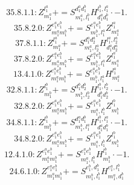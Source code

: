 \documentclass[letterpaper,10pt,fleqn,leqno,onecolumn]{article}
\begin{document}
\begin{equation} \;\;\;\;\;\;  35.8.1.1: Z^{l_{1}^{a}}_{m_{1}^{a}}+=S^{d_{1}^{a}d_{1}^{b}}_{m_{1}^{a},l_{1}^{b}}H^{l_{1}^{b},l_{1}^{a}}_{d_{1}^{a}d_{1}^{b}}\cdot -1. \end{equation}
\begin{equation} \;\;\;\;\;\;  35.8.2.0: Z^{e_{1}^{a}e_{1}^{b}}_{m_{1}^{a}m_{1}^{b}}+=S^{e_{1}^{a}e_{1}^{b}}_{m_{1}^{b},l_{1}^{a}}Z^{l_{1}^{a}}_{m_{1}^{a}} \end{equation}
\begin{equation} \;\;\;\;\;\;  37.8.1.1: Z^{l_{1}^{a}}_{m_{1}^{a}}+=S^{d_{1}^{a}d_{2}^{a}}_{m_{1}^{a},l_{2}^{a}}H^{l_{1}^{a},l_{2}^{a}}_{d_{1}^{a}d_{2}^{a}} \end{equation}
\begin{equation} \;\;\;\;\;\;  37.8.2.0: Z^{e_{1}^{a}e_{1}^{b}}_{m_{1}^{a}m_{1}^{b}}+=S^{e_{1}^{a}e_{1}^{b}}_{m_{1}^{b},l_{1}^{a}}Z^{l_{1}^{a}}_{m_{1}^{a}} \end{equation}
\begin{equation} \;\;\;\;\;\;  13.4.1.0: Z^{e_{1}^{a}e_{1}^{b}}_{m_{1}^{a}m_{1}^{b}}+=S^{e_{1}^{a}e_{1}^{b}}_{m_{1}^{b},l_{1}^{a}}H^{l_{1}^{a}}_{m_{1}^{a}} \end{equation}
\begin{equation} \;\;\;\;\;\;  32.8.1.1: Z^{l_{1}^{b}}_{m_{1}^{b}}+=S^{d_{1}^{b}d_{2}^{b}}_{m_{1}^{b},l_{2}^{b}}H^{l_{1}^{b},l_{2}^{b}}_{d_{1}^{b}d_{2}^{b}}\cdot -1. \end{equation}
\begin{equation} \;\;\;\;\;\;  32.8.2.0: Z^{e_{1}^{a}e_{1}^{b}}_{m_{1}^{a}m_{1}^{b}}+=S^{e_{1}^{a}e_{1}^{b}}_{m_{1}^{a},l_{1}^{b}}Z^{l_{1}^{b}}_{m_{1}^{b}} \end{equation}
\begin{equation} \;\;\;\;\;\;  34.8.1.1: Z^{l_{1}^{b}}_{m_{1}^{b}}+=S^{d_{1}^{a}d_{1}^{b}}_{m_{1}^{b},l_{1}^{a}}H^{l_{1}^{b},l_{1}^{a}}_{d_{1}^{a}d_{1}^{b}}\cdot -1. \end{equation}
\begin{equation} \;\;\;\;\;\;  34.8.2.0: Z^{e_{1}^{a}e_{1}^{b}}_{m_{1}^{a}m_{1}^{b}}+=S^{e_{1}^{a}e_{1}^{b}}_{m_{1}^{a},l_{1}^{b}}Z^{l_{1}^{b}}_{m_{1}^{b}} \end{equation}
\begin{equation} \;\;\;\;\;\;  12.4.1.0: Z^{e_{1}^{a}e_{1}^{b}}_{m_{1}^{a}m_{1}^{b}}+=S^{e_{1}^{a}e_{1}^{b}}_{m_{1}^{a},l_{1}^{b}}H^{l_{1}^{b}}_{m_{1}^{b}}\cdot -1. \end{equation}
\begin{equation} \;\;\;\;\;\;  24.6.1.0: Z^{e_{1}^{a}e_{1}^{b}}_{m_{1}^{a}m_{1}^{b}}+=S^{e_{1}^{b},d_{1}^{b}}_{m_{1}^{b},l_{1}^{b}}H^{e_{1}^{a},l_{1}^{b}}_{m_{1}^{a},d_{1}^{b}} \end{equation}
\end{document}
